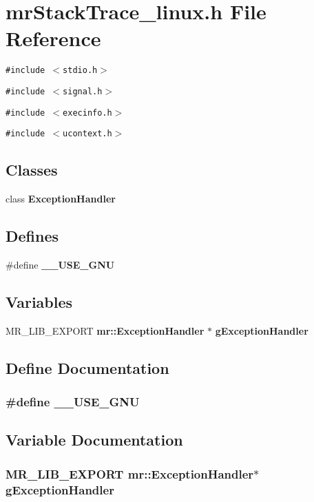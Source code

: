\section{mr\-Stack\-Trace\_\-linux.h File Reference}
\label{mrStackTrace__linux_8h}
{\tt \#include $<$stdio.h$>$}\par
{\tt \#include $<$signal.h$>$}\par
{\tt \#include $<$execinfo.h$>$}\par
{\tt \#include $<$ucontext.h$>$}\par
\subsection*{Classes}
\begin{CompactItemize}
\item 
class {\bf Exception\-Handler}
\end{CompactItemize}
\subsection*{Defines}
\begin{CompactItemize}
\item 
\#define {\bf \_\-\_\-USE\_\-GNU}
\end{CompactItemize}
\subsection*{Variables}
\begin{CompactItemize}
\item 
MR\_\-LIB\_\-EXPORT {\bf mr::Exception\-Handler} $\ast$ {\bf g\-Exception\-Handler}
\end{CompactItemize}


\subsection{Define Documentation}
\subsubsection{\setlength{\rightskip}{0pt plus 5cm}\#define \_\-\_\-USE\_\-GNU}\label{mrStackTrace__linux_8h_a0}




\subsection{Variable Documentation}
\subsubsection{\setlength{\rightskip}{0pt plus 5cm}MR\_\-LIB\_\-EXPORT {\bf mr::Exception\-Handler}$\ast$ {\bf g\-Exception\-Handler}}\label{mrStackTrace__linux_8h_a1}


